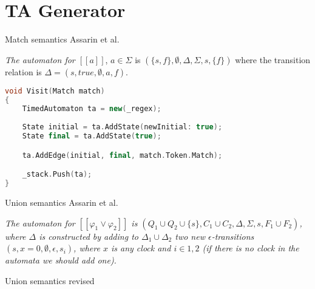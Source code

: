 
\section{TA Generator}
\begin{frame}[fragile]{Match semantics}
    Assarin et al.

    \textit{The automaton for \underline{$[\![a]\!]$}}, $a\in\Sigma$ is $(\{s,f\},\emptyset,\Delta,\Sigma,s,\{f\})$ where the transition relation is $\Delta={(s,true,\emptyset,a,f)}$.

    \begin{lstlisting}[language=c++,basicstyle=\small]
void Visit(Match match)
{
    TimedAutomaton ta = new(_regex);
    
    State initial = ta.AddState(newInitial: true);
    State final = ta.AddState(true);

    ta.AddEdge(initial, final, match.Token.Match);

    _stack.Push(ta);
}
    \end{lstlisting}
\end{frame}

\begin{frame}{Union semantics}
    Assarin et al.

    \textit{The automaton for $[[\varphi_1\vee\varphi_2]]$ is $(Q_1\cup Q_2 \cup \{s\},C_1\cup C_2,\Delta,\Sigma,s,F_1\cup F_2)$, where $\Delta$ is constructed
        by adding to $\Delta_1\cup \Delta_2$ two new $\epsilon$-transitions $(s, x = 0,\emptyset,\epsilon,s_i)$, where $x$ is any clock and $i\in{1,2}$
        (if there is no clock in the automata we should add one).}

    
    
\end{frame}

\begin{frame}{Union semantics revised}
    
\end{frame}

